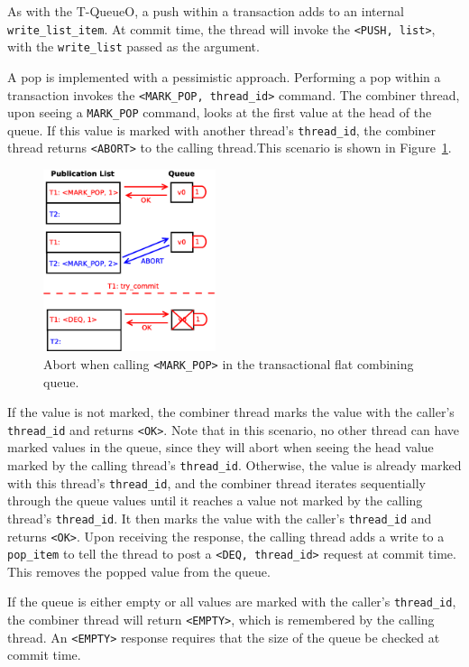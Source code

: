 As with the T-QueueO, a push within a transaction adds to an internal \texttt{write\_list\_item}. At commit time, the thread will invoke the \texttt{<PUSH, list>}, with the \texttt{write\_list} passed as the argument.

A pop is implemented with a pessimistic approach. Performing a pop within a transaction invokes the \texttt{<MARK\_POP, thread\_id>} command. The combiner thread, upon seeing a \texttt{MARK\_POP} command, looks at the first value at the head of the queue. If this value is marked with another thread's \texttt{thread\_id}, the combiner thread returns \texttt{<ABORT>} to the calling thread.This scenario is shown in Figure~\ref{fig:fcqueue_abort1}.

\begin{figure}[t]
\centering
\includegraphics[width=0.45\textwidth]{fcqueue_abort1}
    \caption{Abort when calling \texttt{<MARK\_POP>} in the transactional flat combining queue.}
\label{fig:fcqueue_abort1}
\end{figure}

If the value is not marked, the combiner thread marks the value with the caller's \texttt{thread\_id} and returns \texttt{<OK>}. Note that in this scenario, no other thread can have marked values in the queue, since they will abort when seeing the head value marked by the calling thread's \texttt{thread\_id}. 
Otherwise, the value is already marked with this thread's \texttt{thread\_id}, and the combiner thread iterates sequentially through the queue values until it reaches a value not marked by the calling thread's \texttt{thread\_id}. It then marks the value with the caller's \texttt{thread\_id} and returns \texttt{<OK>}. Upon receiving the response, the calling thread adds a write to a \texttt{pop\_item} to tell the thread to post a \texttt{<DEQ, thread\_id>} request at commit time. This removes the popped value from the queue.

If the queue is either empty or all values are marked with the caller's \texttt{thread\_id}, the combiner thread will return \texttt{<EMPTY>}, which is remembered by the calling thread. An \texttt{<EMPTY>} response requires that the size of the queue be checked at commit time.

